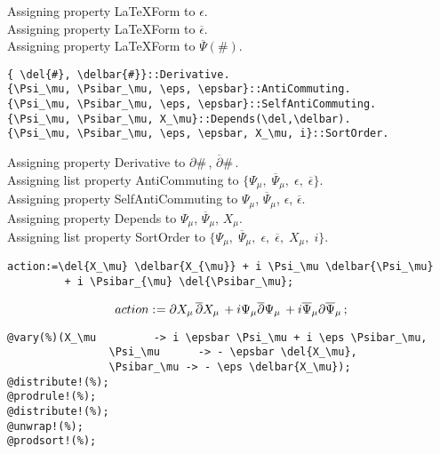\documentclass[11pt]{article}
\def\specialcolon{\mathrel{\mathop{:}}\hspace{-.5em}}
\renewcommand{\bar}[1]{\overline{#1}}
\begin{document}
Assigning property LaTeXForm to $\epsilon$.
\\
Assigning property LaTeXForm to $\bar{\epsilon}$.
\\
Assigning property LaTeXForm to $\bar{\Psi}(\#)$.
\\
{\color[named]{Blue}\begin{verbatim}
{ \del{#}, \delbar{#}}::Derivative.
{\Psi_\mu, \Psibar_\mu, \eps, \epsbar}::AntiCommuting.
{\Psi_\mu, \Psibar_\mu, \eps, \epsbar}::SelfAntiCommuting.
{\Psi_\mu, \Psibar_\mu, X_\mu}::Depends(\del,\delbar).
{\Psi_\mu, \Psibar_\mu, \eps, \epsbar, X_\mu, i}::SortOrder.
\end{verbatim}}
Assigning property Derivative to $\partial{\#}\, $, $\bar{\partial}{\#}\, $.
\\
Assigning list property AntiCommuting to $\{{\Psi}_{\mu},\; {\bar{\Psi}}_{\mu},\; \epsilon,\; \bar{\epsilon}\}$.
\\
Assigning property SelfAntiCommuting to ${\Psi}_{\mu}$, ${\bar{\Psi}}_{\mu}$, $\epsilon$, $\bar{\epsilon}$.
\\
Assigning property Depends to ${\Psi}_{\mu}$, ${\bar{\Psi}}_{\mu}$, ${X}_{\mu}$.
\\
Assigning list property SortOrder to $\{{\Psi}_{\mu},\; {\bar{\Psi}}_{\mu},\; \epsilon,\; \bar{\epsilon},\; {X}_{\mu},\; i\}$.
\\
{\color[named]{Blue}\begin{verbatim}
action:=\del{X_\mu} \delbar{X_{\mu}} + i \Psi_\mu \delbar{\Psi_\mu}
         + i \Psibar_{\mu} \del{\Psibar_\mu};
\end{verbatim}}
\begin{dmath*}[compact, spread=2pt]
action\specialcolon{}= \partial{{X}_{\mu}}\,  \bar{\partial}{{X}_{\mu}}\,  + i {\Psi}_{\mu} \bar{\partial}{{\Psi}_{\mu}}\,  + i {\bar{\Psi}}_{\mu} \partial{{\bar{\Psi}}_{\mu}}\, ;
\end{dmath*}
{\color[named]{Blue}\begin{verbatim}
@vary(%)(X_\mu         -> i \epsbar \Psi_\mu + i \eps \Psibar_\mu,
                \Psi_\mu      -> - \epsbar \del{X_\mu},
                \Psibar_\mu -> - \eps \delbar{X_\mu});
@distribute!(%);
@prodrule!(%);
@distribute!(%);
@unwrap!(%);
@prodsort!(%);
\end{verbatim}}
\end{document}
